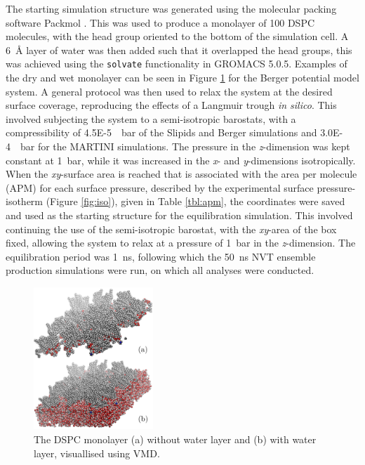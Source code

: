 \documentclass[amsmath,amssymb,twocolumn,superscriptaddress]{revtex4-1}
\begin{document}
The starting simulation structure was generated using the molecular packing
software Packmol \cite{martinez_packmol_2009}.
This was used to produce a monolayer of 100 DSPC molecules, with the head
group oriented to the bottom of the simulation cell.
A \SI{6}{\angstrom} layer of water was then added such that it overlapped
the head groups, this was achieved using the \texttt{solvate} functionality
in GROMACS 5.0.5.
Examples of the dry and wet monolayer can be seen in Figure \ref{fig:drywet}
for the Berger potential model system.
A general protocol was then used to relax the system at the desired surface
coverage, reproducing the effects of a Langmuir trough \emph{in silico}.
This involved subjecting the system to a semi-isotropic barostats, with a
compressibility of \SI{4.5E-5}{\per\bar} of the Slipids and Berger
simulations and \SI{3.0E-4}{\per\bar} for the MARTINI simulations.
The pressure in the \emph{z}-dimension was kept constant at \SI{1}{\bar},
while it was increased in the \emph{x}- and \emph{y}-dimensions isotropically.
When the \emph{xy}-surface area is reached that is associated with the area
per molecule (APM) for each surface pressure, described by the experimental
surface pressure-isotherm (Figure \ref{fig:iso}), given in
Table \ref{tbl:apm}, the coordinates were saved and used as the starting
structure for the equilibration simulation.
This involved continuing the use of the semi-isotropic barostat, with
the \emph{xy}-area of the box fixed, allowing the system to relax at a
pressure of \SI{1}{\bar} in the \emph{z}-dimension.
The equilibration period was \SI{1}{\nano\second}, following which
the \SI{50}{\nano\second} NVT ensemble production simulations were run, on
which all analyses were conducted.
%
\begin{figure}[h]
\centering
  \includegraphics[width=0.4\textwidth]{dspcdrywet}
  \caption{The DSPC monolayer (a) without water layer and (b) with water
  layer, visuallised using VMD\cite{humphrey_vmd_1996}.}
  \label{fig:drywet}
\end{figure}
\end{document}
